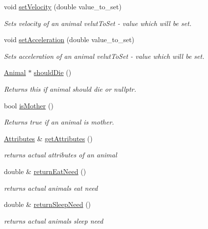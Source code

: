 \begin{DoxyCompactItemize}
void \hyperlink{class_animal_a8df16f635e0fa5c7ff3ec1fabb4e9be7}{set\+Velocity} (double value\+\_\+to\+\_\+set)
\begin{DoxyCompactList}\small\item\em Sets velocity of an animal  velut\+To\+Set -\/ value which will be set. \end{DoxyCompactList}\item 
void \hyperlink{class_animal_ae455eb17f64f95f159c5f8fdc4a67728}{set\+Acceleration} (double value\+\_\+to\+\_\+set)
\begin{DoxyCompactList}\small\item\em Sets acceleration of an animal  velut\+To\+Set -\/ value which will be set. \end{DoxyCompactList}\item 
\hyperlink{class_animal}{Animal} $\ast$ \hyperlink{class_animal_adc62fe75008f9f24570d83f1279ba938}{should\+Die} ()
\begin{DoxyCompactList}\small\item\em Returns this if animal should die or nullptr. \end{DoxyCompactList}\item 
bool \hyperlink{class_animal_a88babf3ca0b62e73d713bbeda5982975}{is\+Mother} ()
\begin{DoxyCompactList}\small\item\em Returns true if an animal is mother. \end{DoxyCompactList}\item 
\hyperlink{class_attributes}{Attributes} \& \hyperlink{class_animal_af6d929cb70afccd523e4fdb8a7c7bc2f}{get\+Attributes} ()
\begin{DoxyCompactList}\small\item\em returns actual attributes of an animal \end{DoxyCompactList}\item 
double \& \hyperlink{class_animal_a616394b8840e25c445816d54140e2533}{return\+Eat\+Need} ()
\begin{DoxyCompactList}\small\item\em returns actual animal\textquotesingle{}s eat need \end{DoxyCompactList}\item 
double \& \hyperlink{class_animal_aeacd1807204f0a5c5eefedcd6a8a400a}{return\+Sleep\+Need} ()
\begin{DoxyCompactList}\small\item\em returns actual animal\textquotesingle{}s sleep need \end{DoxyCompactList}\item 

\end{DoxyCompactItemize}
